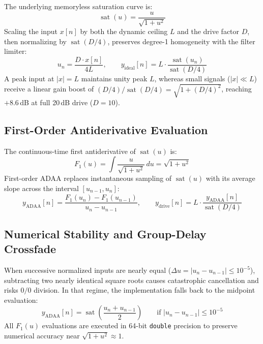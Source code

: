 \documentclass[11pt,letterpaper]{article}
\newcommand{\code}[1]{\texttt{\textcolor{codegray}{#1}}}
\newcommand{\sat}{\operatorname{sat}}
\begin{document}
The underlying memoryless saturation curve is:
\begin{equation}\label{eq:sat}
  \sat(u) = \frac{u}{\sqrt{1 + u^2}}
\end{equation}
Scaling the input $x[n]$ by both the dynamic ceiling $L$ and the drive factor $D$, then normalizing by $\sat(D/4)$, preserves
degree-1 homogeneity with the filter limiter:
\begin{equation}\label{eq:drive}
  u_n = \frac{D \cdot x[n]}{4L}, \qquad y_{\mathrm{ideal}}[n] = L \cdot \frac{\sat(u_n)}{\sat(D/4)}
\end{equation}
A peak input at $|x| = L$ maintains unity peak $L$, whereas small signals ($|x| \ll L$) receive a linear gain boost of
$(D/4)/\sat(D/4) = \sqrt{1 + (D/4)^2}$, reaching $+8.6$\,dB at full 20\,dB drive ($D = 10$).

\subsection{First-Order Antiderivative Evaluation}

The continuous-time first antiderivative of $\sat(u)$ is:
\begin{equation}\label{eq:antideriv}
  F_1(u) = \int \frac{u}{\sqrt{1 + u^2}}\,du = \sqrt{1 + u^2}
\end{equation}
First-order ADAA replaces instantaneous sampling of $\sat(u)$ with its average slope across the interval $[u_{n-1}, u_n]$:
\begin{equation}\label{eq:adaa}
  y_{\mathrm{ADAA}}[n] = \frac{F_1(u_n) - F_1(u_{n-1})}{u_n - u_{n-1}}, \qquad y_{\mathrm{drive}}[n] = L \cdot \frac{y_{\mathrm{ADAA}}[n]}{\sat(D/4)}
\end{equation}

\subsection{Numerical Stability and Group-Delay Crossfade}

When successive normalized inputs are nearly equal ($\Delta u = |u_n - u_{n-1}| \le 10^{-5}$), subtracting two nearly identical
square roots causes catastrophic cancellation and risks $0/0$ division. In that regime, the implementation falls back to
the midpoint evaluation:
\begin{equation}\label{eq:midpoint}
  y_{\mathrm{ADAA}}[n] = \sat\!\left(\frac{u_n + u_{n-1}}{2}\right) \qquad \text{if } |u_n - u_{n-1}| \le 10^{-5}
\end{equation}
All $F_1(u)$ evaluations are executed in 64-bit \code{double} precision to preserve numerical accuracy near $\sqrt{1 + u^2} \approx 1$.
\end{document}
